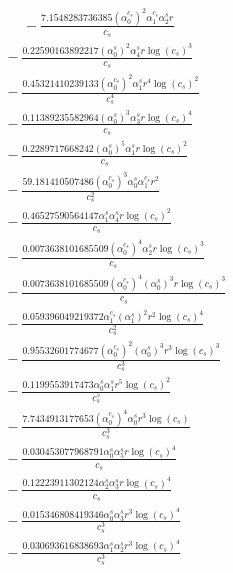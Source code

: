 \documentclass[10pt]{article}
\begin{document}
\begin{align*}
\phantom{R_{0,8}} &\phantom{={}}{}  - \frac{7.1548283736385 \left(\alpha_{0}^{c_s}\right)^{2} \alpha_{1}^{c_s} \alpha_{2}^s r}{c_{s}} \\
&{}  - \frac{0.22590163892217 \left(\alpha_{0}^s\right)^{2} \alpha_{4}^s r \log{\left(c_{s} \right)}^{3}}{c_{s}} \\
&{}  - \frac{0.45321410239133 \left(\alpha_{0}^{c_s}\right)^{2} \alpha_{1}^s r^{4} \log{\left(c_{s} \right)}^{2}}{c_{s}^{4}} \\
&{}  - \frac{0.11389235582964 \left(\alpha_{0}^s\right)^{3} \alpha_{3}^s r \log{\left(c_{s} \right)}^{4}}{c_{s}} \\
&{}  - \frac{0.2289717668242 \left(\alpha_{0}^s\right)^{5} \alpha_{1}^s r \log{\left(c_{s} \right)}^{2}}{c_{s}} \\
&{}  - \frac{59.181410507486 \left(\alpha_{0}^{c_s}\right)^{3} \alpha_{0}^s \alpha_{1}^{c_s} r^{2}}{c_{s}^{2}} \\
&{}  - \frac{0.46527590564147 \alpha_{1}^s \alpha_{4}^s r \log{\left(c_{s} \right)}^{2}}{c_{s}} \\
&{}  - \frac{0.0073638101685509 \left(\alpha_{0}^{c_s}\right)^{4} \alpha_{2}^s r \log{\left(c_{s} \right)}^{3}}{c_{s}} \\
&{}  - \frac{0.0073638101685509 \left(\alpha_{0}^{c_s}\right)^{4} \left(\alpha_{0}^s\right)^{3} r \log{\left(c_{s} \right)}^{3}}{c_{s}} \\
&{}  - \frac{0.059396049219372 \alpha_{1}^{c_s} \left(\alpha_{1}^s\right)^{2} r^{2} \log{\left(c_{s} \right)}^{4}}{c_{s}^{2}} \\
&{}  - \frac{0.95532601774677 \left(\alpha_{0}^{c_s}\right)^{2} \left(\alpha_{0}^s\right)^{3} r^{3} \log{\left(c_{s} \right)}^{3}}{c_{s}^{3}} \\
&{}  - \frac{0.1199553917473 \alpha_{0}^s \alpha_{1}^s r^{5} \log{\left(c_{s} \right)}^{2}}{c_{s}^{5}} \\
&{}  - \frac{7.7434913177653 \left(\alpha_{0}^{c_s}\right)^{4} \alpha_{0}^s r^{3} \log{\left(c_{s} \right)}}{c_{s}^{3}} \\
&{}  - \frac{0.030453077968791 \alpha_{0}^s \alpha_{5}^s r \log{\left(c_{s} \right)}^{4}}{c_{s}} \\
&{}  - \frac{0.12223911302124 \alpha_{2}^s \alpha_{3}^s r \log{\left(c_{s} \right)}^{4}}{c_{s}} \\
&{}  - \frac{0.015346808419346 \alpha_{0}^s \alpha_{3}^s r^{3} \log{\left(c_{s} \right)}^{4}}{c_{s}^{3}} \\
&{}  - \frac{0.030693616838693 \alpha_{1}^s \alpha_{2}^s r^{3} \log{\left(c_{s} \right)}^{4}}{c_{s}^{3}} \\

\end{align*}
\end{document}
